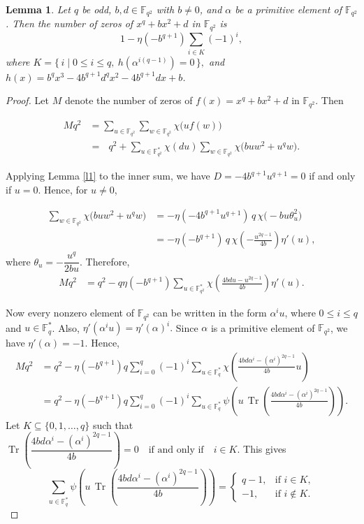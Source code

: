 \documentclass[12pt]{amsart}
\newtheorem{lemma}[theorem]{Lemma}
\theoremstyle{definition}
\theoremstyle{remark}
\numberwithin{equation}{section}
\begin{document}
\begin{lemma}\label{l6}
Let $q$ be odd, $b,d \in \mathbb{F}_{q^2}$ with $b \neq 0$, and $\alpha$ be a primitive element of $\mathbb{F}_{q^2}$. Then the number of zeros of
$x^q+bx^2+d$ in $\mathbb{F}_{q^2}$ is
$$
1-\eta(-b^{q+1}) \sum_{i \in K} (-1)^i,
$$
where
$K=\{\, i \mid 0 \leq i \leq q,\ h(\alpha^{i(q-1)})=0 \,\},
$ and $h(x)=b^q x^3-4b^{q+1}d^q x^2-4b^{q+1}d x+b$.

\end{lemma}
\begin{proof}
Let $M$ denote the number of zeros of $f(x)=x^q+bx^2+d$ in $\mathbb{F}_{q^2}$. Then

\begin{align*}
Mq^2 
&= \sum_{u \in \mathbb{F}_{q^2}} \sum_{w \in \mathbb{F}_{q^2}} \chi\big(u f(w)\big) \\
&= \text{ 
}q^2 + \sum_{u \in \mathbb{F}_{q^2}^{*}} \chi(du) \sum_{w \in \mathbb{F}_{q^2}} \chi\big(b u w^2 + u^q w\big).
\end{align*}

Applying Lemma \ref{l1} to the inner sum, we have $D=-4b^{q+1}u^{q+1}=0$ if and only if $u=0$. Hence, for $u \neq 0$,  

\begin{align*}
\sum_{w \in \mathbb{F}_{q^2}} \chi\big(b u w^2 + u^q w\big) 
&= -\eta(-4 b^{q+1} u^{q+1}) \, q \, \chi\big(-b u \theta_u^2\big) \\
&= -\eta(-b^{q+1}) \, q \, \chi\left(-\frac{u^{2q-1}}{4b}\right) \eta'(u),
\end{align*}
where $\theta_u=-\dfrac{u^q}{2bu}$.
 Therefore,
\begin{align*}
Mq^2
&= q^2-q\eta(-b^{q+1})\sum_{u \in \mathbb{F}_{q^2}^{*}} \chi\left(\frac{4bdu-u^{2q-1}}{4b}\right)\eta'(u).
\end{align*}

Now every nonzero element of $\mathbb{F}_{q^2}$ can be written in the form $\alpha^i u$, where $0 \leq i \leq q$ and $u \in \mathbb{F}_q^{*}$. Also,
$
\eta'(\alpha^i u)=\eta'(\alpha)^i.
$
Since $\alpha$ is a primitive element of $\mathbb{F}_{q^2}$, we have
$
\eta'(\alpha)=-1.
$
Hence,
\begin{align*}
Mq^2
&= q^2-\eta(-b^{q+1})q\sum_{i=0}^{q}(-1)^i\sum_{u \in \mathbb{F}_q^{*}}
\chi\left(\frac{4bd\alpha^i-(\alpha^i)^{2q-1}}{4b}u\right) \\
&= q^2-\eta(-b^{q+1})q\sum_{i=0}^{q}(-1)^i\sum_{u \in \mathbb{F}_q^{*}}
\psi\left(u\,\operatorname{Tr}\left(\frac{4bd\alpha^i-(\alpha^i)^{2q-1}}{4b}\right)\right).
\end{align*}
Let $K\subseteq\{0,1,\dots,q\}$ such that
$
\operatorname{Tr}\left(\dfrac{4bd\alpha^i-(\alpha^i)^{2q-1}}{4b}\right)=0
\quad \text{if and only if} \quad i \in K.
$
This gives
$$
\sum_{u \in \mathbb{F}_q^{*}} \psi\left(u\,\operatorname{Tr}\left(\frac{4bd\alpha^i-(\alpha^i)^{2q-1}}{4b}\right)\right)
=
\begin{cases}
q-1, & \text{if } i \in K,\\
-1, & \text{if } i \notin K.
\end{cases}
$$


\end{proof}
\end{document}

